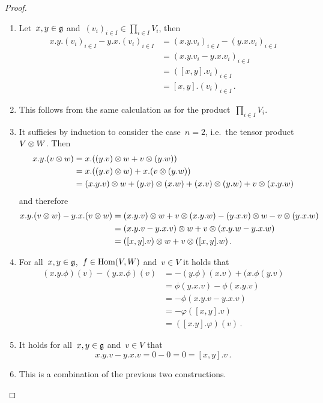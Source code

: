 \begin{proof}
  \leavevmode
  \begin{enumerate}
    \item
      Let~$x, y \in \mathfrak{g}$ and~$(v_i)_{i \in I} \in \prod_{i \in I} V_i$, then
      \begin{align*}
        x.y.(v_i)_{i \in I} - y.x.(v_i)_{i \in I}
        &=
        (x.y.v_i)_{i \in I} - (y.x.v_i)_{i \in I}
        \\
        &=
        (x.y.v_i - y.x.v_i)_{i \in I}
        \\
        &=
        ([x,y].v_i)_{i \in I}
        \\
        &=
        [x,y].(v_i)_{i \in I} \,.
      \end{align*}
    \item
      This follows from the same calculation as for the product~$\prod_{i \in I} V_i$.
    \item
      It sufficies by induction to consider the case~$n = 2$, i.e.\ the tensor product~$V \otimes W$.
      Then
      \begin{align*}
        x.y.(v \otimes w)
        &=
        x.((y.v) \otimes w + v \otimes (y.w))
        \\
        &=
        x.((y.v) \otimes w) + x.(v \otimes (y.w))
        \\
        &=
        (x.y.v) \otimes w + (y.v) \otimes (x.w) + (x.v) \otimes (y.w) + v \otimes (x.y.w)
      \end{align*}
      and therefore
      \begin{align*}
        x.y.(v \otimes w) - y.x.(v \otimes w)
        &=
        (x.y.v) \otimes w + v \otimes (x.y.w) - (y.x.v) \otimes w - v \otimes (y.x.w)
        \\
        &=
        (x.y.v - y.x.v) \otimes w + v \otimes (x.y.w - y.x.w)
        \\
        &=
        ([x,y].v) \otimes w + v \otimes ([x,y].w) \,.
      \end{align*}
    \item
      For all~$x,y \in \mathfrak{g}$,~$f \in \operatorname{Hom}(V,W)$ and~$v \in V$ it holds that
      \begin{align*}
        (x.y.\phi)(v) - (y.x.\phi)(v)
        &=
        -(y.\phi)(x.v) + (x.\phi(y.v)
        \\
        &=
        \phi(y.x.v) - \phi(x.y.v)
        \\
        &=
        -\phi(x.y.v - y.x.v)
        \\
        &=
        -\varphi([x,y].v)
        \\
        &=
        ([x.y].\varphi)(v)  \,.
      \end{align*}
    \item
      It holds for all~$x,y \in \mathfrak{g}$ and~$v \in V$ that
      \[
        x.y.v - y.x.v
        =
        0 - 0
        =
        0
        =
        [x,y].v \,.
      \]
    \item
      This is a combination of the previous two constructions.
    \qedhere
  \end{enumerate}
\end{proof}


